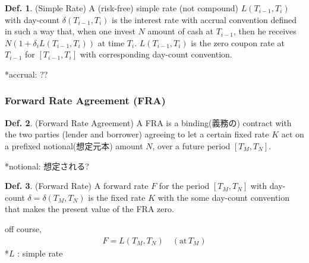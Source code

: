 \documentclass[a4paper,11pt]{jsarticle}
\theoremstyle{definition}
\newtheorem{definition}{Def.}[subsection]
\begin{document}
\begin{definition}{(Simple Rate)}
  A (risk-free) simple rate (not compound) $L(T_{i-1},T_i)$
  with day-count $\delta(T_{i-1},T_i)$ is the interest rate with
  accrual convention defined in such a way that, when one invest
  $N$ amount of cash at $T_{i-1}$, then he receives
  $N(1+\delta_i L(T_{i-1},T_i))$ at time $T_i$.
  $L(T_{i-1},T_i)$ is the zero coupon rate at $T_{i-1}$
  for $[T_{i-1},T_i]$ with corresponding day-count convention.
\end{definition}
*accrual: ??

\subsubsection{Forward Rate Agreement (FRA)}
\begin{definition}{(Forward Rate Agreement)}
  A FRA is a binding(義務の) contract with the two parties
  (lender and borrower) agreeing to let a certain fixed rate $K$
  act on a prefixed notional(想定元本)
  amount $N$, over a future period
  $[T_M, T_N]$.
\end{definition}
*notional: 想定される?

\begin{definition}{(Forward Rate)}
  A forward rate $F$ for the period $[T_M,T_N]$ with day-count
  $\delta=\delta(T_M,T_N)$ is the fixed rate $K$ with the some
  day-count convention that makes the present value of the FRA zero.
\end{definition}

off course,
\begin{align}
  F=L(T_M, T_N) \quad (\mbox{at} \, T_M)
\end{align}
*$L$ : simple rate
\end{document}
